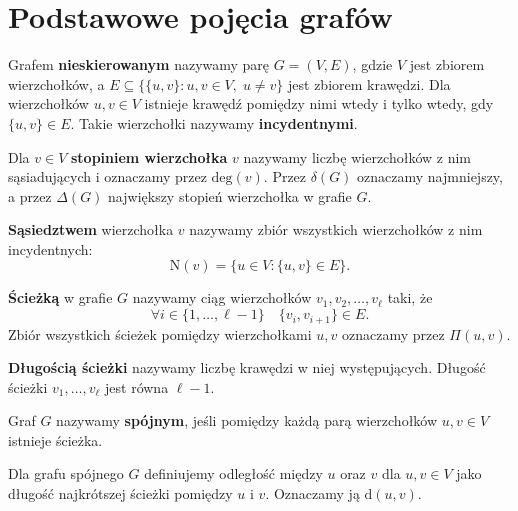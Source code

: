 \section{Podstawowe pojęcia grafów}

\begin{definition}
Grafem \textbf{nieskierowanym} nazywamy parę $G = (V, E)$, gdzie $V$ jest zbiorem wierzchołków, a $E \subseteq \{ \{u, v\} : u, v \in V, \; u \neq v \}$ jest zbiorem krawędzi.  
Dla wierzchołków $u, v \in V$ istnieje krawędź pomiędzy nimi wtedy i tylko wtedy, gdy $\{u, v\} \in E$. Takie wierzchołki nazywamy \textbf{incydentnymi}.
\end{definition}

\begin{definition}
Dla $v \in V$ \textbf{stopiniem wierzchołka} $v$ nazywamy liczbę wierzchołków z nim sąsiadujących i oznaczamy przez $\mathrm{deg}(v)$.  
Przez $\delta(G)$ oznaczamy najmniejszy, a przez $\Delta(G)$ największy stopień wierzchołka w grafie $G$.
\end{definition}

\begin{definition}
\textbf{Sąsiedztwem} wierzchołka $v$ nazywamy zbiór wszystkich wierzchołków z nim incydentnych:
\[
\mathrm{N}(v) = \{ u \in V : \{u, v\} \in E \}.
\]
\end{definition}

\begin{definition}
\textbf{Ścieżką} w grafie $G$ nazywamy ciąg wierzchołków $v_1, v_2, \dots, v_\ell$ taki, że
\[
\forall i \in \{1, \dots, \ell - 1\} \quad \{v_i, v_{i+1}\} \in E.
\]
Zbiór wszystkich ścieżek pomiędzy wierzchołkami $u, v$ oznaczamy przez $\Pi(u, v)$.
\end{definition}

\begin{definition}
\textbf{Długością ścieżki} nazywamy liczbę krawędzi w niej występujących. Długość ścieżki $v_1, \dots, v_\ell$ jest równa $\ell - 1$.
\end{definition}

\begin{definition}
Graf $G$ nazywamy \textbf{spójnym}, jeśli pomiędzy każdą parą wierzchołków $u, v \in V$ istnieje ścieżka. 
\end{definition}

\begin{definition}
Dla grafu spójnego $G$ definiujemy odległość między $u$ oraz $v$ dla $u,v\in V$ jako długość najkrótszej ścieżki pomiędzy $u$ i $v$. Oznaczamy ją $\mathrm{d}(u,v)$.
\end{definition}

